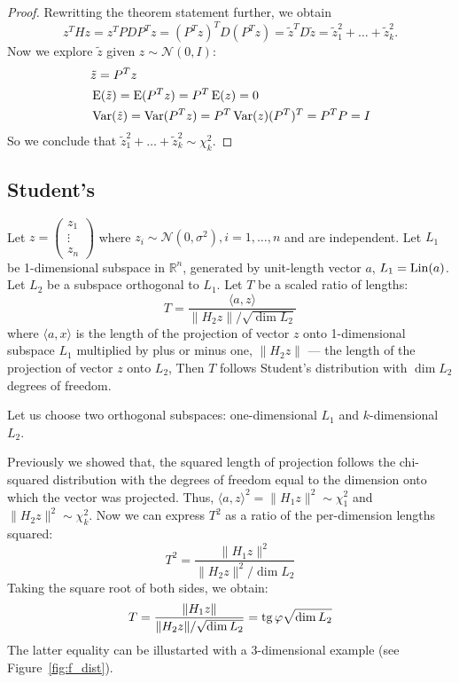 \begin{proof}
Rewritting the theorem statement further, we obtain
\[
z^T H z = z^T P D P^T z = (P^T z)^T D (P^T z) = \tilde z^T D \tilde z = \tilde z_1^2 + \ldots + \tilde z_k^2.
\]
Now we explore $\tilde z$ given $z \sim \mathcal{N}(0, I)$:
\begin{align*}
&\tilde z = P^T z \\
&\operatorname{E}(\tilde z) = \operatorname{E}(P^T z) = P^T \operatorname{E}(z) = 0 \\
&\operatorname{Var}(\tilde z) = \operatorname{Var}(P^T z) = P^T \operatorname{Var}(z) (P^T)^T = P^T P = I
\end{align*}
So we conclude that $\tilde z_1^2 + \ldots + \tilde z_k^2 \sim \chi^2_k$.

\end{proof}


\subsection{Student's}


\begin{definition}
Let  $z = \begin{pmatrix} z_1 \\ \vdots \\ z_n \end{pmatrix}$
where $z_i \sim \mathcal{N}(0, \sigma^2), i=1, \ldots, n$ and are independent.
Let $L_1$ be 1-dimensional subspace in $\mathbb{R}^{n}$,
generated by unit-length vector $a$, $L_1 = \operatorname{Lin}(a)$.
Let $L_2$ be a subspace orthogonal to $L_1$.
Let $T$ be a scaled ratio of lengths:
\[
T = \frac{\langle a, z \rangle}{\lVert H_2 z \rVert / \sqrt{\dim L_2}}
\]
where $\langle a, x \rangle$ is the length of the projection of vector $z$ onto
1-dimensional subspace $L_1$ multiplied by plus or minus one,
$\lVert H_2 z \rVert$ — the length of the projection of vector $z$ onto $L_2$,
Then $T$ follows Student's distribution with $\dim L_2$ degrees of freedom.
\end{definition}

Let us choose two orthogonal subspaces: one-dimensional $L_1$ and
$k$-dimensional $L_2$.

Previously we showed that, the squared length of projection follows
the chi-squared distribution with the degrees of freedom equal to the dimension
onto which the vector was projected. Thus, $\langle a, z \rangle^2 = \lVert H_1 z \rVert^2 \sim \chi^2_1$
and $\lVert H_2 z \rVert^2 \sim \chi^2_{k}$.
Now we can express $T^2$ as a ratio of the per-dimension lengths squared:
\[
T^2 = \frac{\lVert H_1 z \rVert^2}{\lVert H_2 z \rVert^2 / \dim L_2}
\]
Taking the square root of both sides, we obtain:
\[
T = \frac{\lVert H_1 z \rVert}{\lVert H_2 z \rVert / \sqrt{\dim L_2}} = \operatorname{tg} \varphi \sqrt{\dim L_2}
\]
The latter equality can be illustarted with a $3$-dimensional example (see Figure~\ref{fig:f_dist}).





